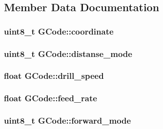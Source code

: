 \subsection{Member Data Documentation}
\hypertarget{class_g_code_a4311a77cb2efcc0bce0c582ae80755e1}{
\subsubsection[{coordinate}]{\setlength{\rightskip}{0pt plus 5cm}uint8\+\_\+t G\+Code\+::coordinate}}\label{class_g_code_a4311a77cb2efcc0bce0c582ae80755e1}
\hypertarget{class_g_code_a77dad1d8057ecc38242757923a2bb87f}{
\subsubsection[{distanse\+\_\+mode}]{\setlength{\rightskip}{0pt plus 5cm}uint8\+\_\+t G\+Code\+::distanse\+\_\+mode}}\label{class_g_code_a77dad1d8057ecc38242757923a2bb87f}
\hypertarget{class_g_code_a2fc16db9dc5dbe95abc8b9b2a5ab6f5c}{
\subsubsection[{drill\+\_\+speed}]{\setlength{\rightskip}{0pt plus 5cm}float G\+Code\+::drill\+\_\+speed}}\label{class_g_code_a2fc16db9dc5dbe95abc8b9b2a5ab6f5c}
\hypertarget{class_g_code_a0115efce11fdffa2c59304706ecacede}{
\subsubsection[{feed\+\_\+rate}]{\setlength{\rightskip}{0pt plus 5cm}float G\+Code\+::feed\+\_\+rate}}\label{class_g_code_a0115efce11fdffa2c59304706ecacede}
\hypertarget{class_g_code_acbf5f3b9aeffe27d3f87e9d57b487146}{
\subsubsection[{forward\+\_\+mode}]{\setlength{\rightskip}{0pt plus 5cm}uint8\+\_\+t G\+Code\+::forward\+\_\+mode}}\label{class_g_code_acbf5f3b9aeffe27d3f87e9d57b487146}

